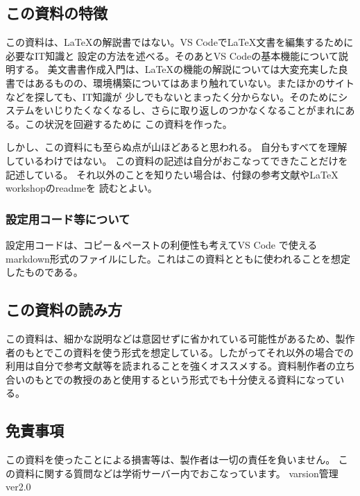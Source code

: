 \documentclass{ltjsarticle}
\begin{document}
\subsection{この資料の特徴}
この資料は、\LaTeX の解説書ではない。VS Codeで\LaTeX 文書を編集するために必要なIT知識と
設定の方法を述べる。そのあとVS Codeの基本機能について説明する。
美文書書作成入門\cite{美文書本}は、\LaTeX の機能の解説については大変充実した良書ではあるものの、環境構築についてはあまり触れていない。またほかのサイトなどを探しても、IT知識が
少しでもないとまったく分からない。そのためにシステムをいじりたくなくなるし、さらに取り返しのつかなくなることがまれにある。この状況を回避するために
この資料を作った。

しかし、この資料にも至らぬ点が山ほどあると思われる。
自分もすべてを理解しているわけではない。
この資料の記述は自分がおこなってできたことだけを記述している。
それ以外のことを知りたい場合は、付録の参考文献やLaTeX workshopのreadmeを
読むとよい。

\subsubsection{設定用コード等について}
設定用コードは、コピー＆ペーストの利便性も考えてVS Code で使えるmarkdown形式のファイルにした。これはこの資料とともに使われることを想定したものである。


\subsection{この資料の読み方}
この資料は、細かな説明などは意図せずに省かれている可能性があるため、製作者のもとでこの資料を使う形式を想定している。したがってそれ以外の場合での利用は自分で参考文献等を読まれることを強くオススメする。資料制作者の立ち合いのもとでの教授のあと使用するという形式でも十分使える資料になっている。

\subsection{免責事項}
この資料を使ったことによる損害等は、製作者は一切の責任を負いません。
この資料に関する質問などは学術サーバー内でおこなっています。
varsion管理  ver2.0
\end{document}
